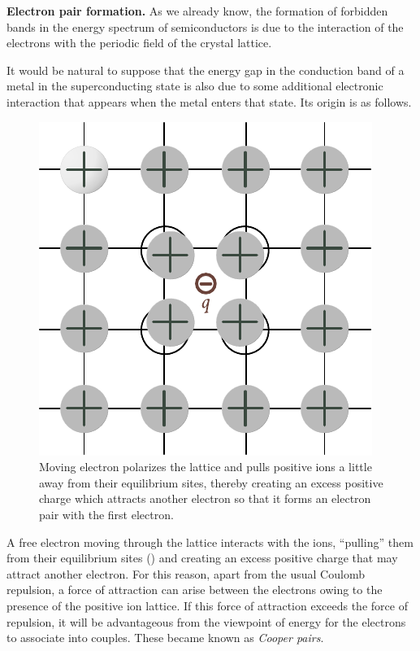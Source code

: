 \textbf{Electron pair formation.} As we already know, the formation of forbidden bands in the energy spectrum of semiconductors is due to the interaction of the electrons with the periodic field of the crystal lattice.

It would be natural to suppose that the energy gap in the conduction band of a metal in the superconducting state is also due to some additional electronic interaction that appears when the metal enters that state. Its origin is as follows.

\begin{figure}[t]
	\begin{center}
		\includegraphics[scale=1.0]{figures/ch_06/fig_6_31.pdf}
		\caption[]{Moving electron polarizes the lattice and pulls positive ions a little away from their equilibrium sites, thereby creating an excess positive charge which attracts another electron so that it forms an electron pair with the first electron.}
		\label{fig:6_31}
	\end{center}
	\vspace{-0.7cm}
\end{figure}

A free electron moving through the lattice interacts with the ions, ``pulling'' them from their equilibrium sites () and creating an excess positive charge that may attract another electron. For this reason, apart from the usual Coulomb repulsion, a force of attraction can arise between the electrons owing to the presence of the
positive ion lattice. If this force of attraction exceeds the force of repulsion, it will be advantageous from the viewpoint of energy for
the electrons to associate into couples. These became known as \textit{Cooper pairs}.

